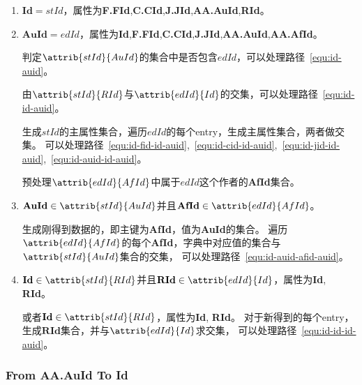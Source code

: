 \documentclass[hyperref,UTF8]{ctexart}
\theoremstyle{definition}
\theoremstyle{remark}
\numberwithin{equation}{subsection}
\newcommand{\Emph}{\textbf}
\newcommand{\Evaluate}{\Emph{Evaluate}}
\newcommand{\Id}{\Emph{Id}}
\newcommand{\RId}{\Emph{RId}}
\newcommand{\FFId}{\Emph{F.FId}}
\newcommand{\CCId}{\Emph{C.CId}}
\newcommand{\JJId}{\Emph{J.JId}}
\newcommand{\AAAuId}{\Emph{AA.AuId}}
\newcommand{\AAAfId}{\Emph{AA.AfId}}
\begin{document}
	\begin{enumerate}[(1)]
	
		\item {}$\Emph{Id}=stId$，属性为\FFId,\CCId,\JJId,\AAAuId,\RId。
	
		\item {}$\Emph{AuId}=edId$，属性为\Id,\FFId,\CCId,\JJId,\AAAuId,\AAAfId。
		
		判定$\attrib{stId}{AuId}$的集合中是否包含$edId$，可以处理路径~\ref{equ:id-auid}。
		
		由$\attrib{stId}{RId}$与$\attrib{edId}{Id}$的交集，可以处理路径~\ref{equ:id-id-auid}。
		
		生成$stId$的主属性集合，遍历$edId$的每个entry，生成主属性集合，两者做交集。
		可以处理路径~\ref{equ:id-fid-id-auid},~\ref{equ:id-cid-id-auid},~\ref{equ:id-jid-id-auid},~\ref{equ:id-auid-id-auid}。
		
		预处理$\attrib{edId}{AfId}$中属于$edId$这个作者的\Emph{AfId}集合。
		
		\item {}$\Emph{AuId} \in \attrib{stId}{AuId}$并且$\Emph{AfId} \in \attrib{edId}{AfId}$。
		
		生成刚得到数据的，即主键为\Emph{AfId}，值为\Emph{AuId}的集合。
		遍历$\attrib{edId}{AfId}$的每个\Emph{AfId}，字典中对应值的集合与$\attrib{stId}{AuId}$集合的交集，
		可以处理路径~\ref{equ:id-auid-afid-auid}。
		
		\item {}$\Emph{Id} \in \attrib{stId}{RId}$并且$\Emph{RId} \in \attrib{edId}{Id}$，属性为\Id, \RId。
		
		或者$\Emph{Id} \in \attrib{stId}{RId}$，属性为\Id, \RId。
		对于新得到的每个entry，生成$\Emph{RId}$集合，并与$\attrib{edId}{Id}$求交集，
		可以处理路径~\ref{equ:id-id-id-auid}。
	
	\end{enumerate}

\subsubsection{From \Emph{AA.AuId} To \Emph{Id}}
\end{document}
